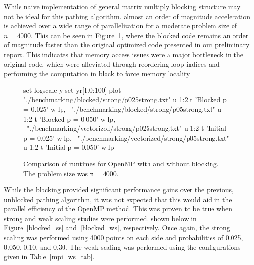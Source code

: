 \documentclass[11pt]{article}
\begin{document}
\noindent While naive implementation of general matrix multiply blocking structure may not be ideal for this pathing algorithm, almost an order of magnitude acceleration is achieved over a wide range of parallelization for a moderate problem size of $n = 4000$. This can be seen in Figure~\ref{blocked_faster}, where the blocked code remains an order of magnitude faster than the original optimized code presented in our preliminary report. This indicates that memory access issues were a major bottleneck in the original code, which were alleviated through reordering loop indices and performing the computation in block to force memory locality.
\begin{figure}[h]
	\begin{center}
		\begin{gnuplot}[terminal=cairolatex, terminaloptions= color] 
			set logscale y
			set yr[1.0:100]
			plot "./benchmarking/blocked/strong/p025strong.txt" u 1:2 t 'Blocked p = 0.025' w lp, \
			"./benchmarking/blocked/strong/p05strong.txt" u 1:2 t 'Blocked p = 0.050' w lp, \
			"./benchmarking/vectorized/strong/p025strong.txt" u 1:2 t 'Initial p = 0.025' w lp, \
			"./benchmarking/vectorized/strong/p05strong.txt" u 1:2 t 'Initial p = 0.050' w lp
		\end{gnuplot}
		\caption{Comparison of runtimes for OpenMP with and without blocking. The problem size was $\mathtt{n} = 4000$.}
		\label{blocked_faster}
	\end{center}
\end{figure}
\newpage
\noindent While the blocking provided significant performance gains over the previous, unblocked pathing algorithm, it was not expected that this would aid in the parallel efficiency of the OpenMP method. This was proven to be true when strong and weak scaling studies were performed, shown below in Figure~\ref{blocked_ss} and~\ref{blocked_ws}, respectively. Once again, the strong scaling was performed using 4000 points on each side and probabilities of 0.025, 0.050, 0.10, and 0.30. The weak scaling was performed using the configurations given in Table~\ref{mpi_ws_tab}.
\end{document}
